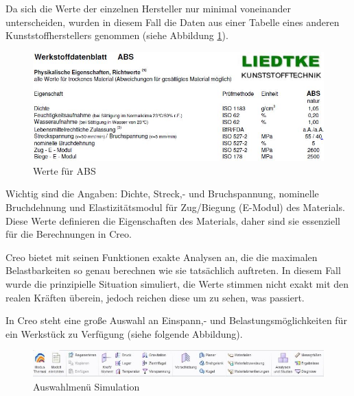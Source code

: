	Da sich die Werte der einzelnen Hersteller nur minimal voneinander unterscheiden,
	wurden in diesem Fall die Daten aus einer Tabelle eines anderen Kunststoffherstellers genommen (siehe Abbildung \ref{werte_abs}).

			\begin{figure}[H]
			\begin{centering}
			\includegraphics[width = 1\textwidth]{Bilder/werte_abs}
			\par\end{centering}
			\caption[Werte ABS]{Werte für ABS\cite{werte_abs}}
			\label{werte_abs}
			\end{figure}

	Wichtig sind die Angaben: Dichte, Streck,- und Bruchspannung, nominelle Bruchdehnung und Elastizitätsmodul für Zug/Biegung (E-Modul) des Materials.
	Diese Werte definieren die Eigenschaften des Materials, daher sind sie essenziell für die Berechnungen in Creo.

	Creo bietet mit seinen Funktionen exakte Analysen an, die die maximalen Belastbarkeiten so genau berechnen wie sie tatsächlich auftreten.
	In diesem Fall wurde die prinzipielle Situation simuliert, die Werte stimmen nicht exakt mit den realen Kräften überein, jedoch reichen diese um zu sehen, was passiert.

	In Creo steht eine große Auswahl an Einspann,- und Belastungsmöglichkeiten für ein Werkstück zu Verfügung (siehe folgende Abbildung).

			\begin{figure}[H]
			\begin{centering}
			\includegraphics[width = 1\textwidth]{Bilder/auswahl_creo}
			\par\end{centering}
			\caption{Auswahlmenü Simulation}
			\label{auswahl_creo}
			\end{figure}

